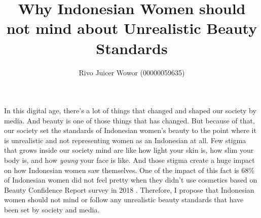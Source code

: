 \documentclass[12pt]{article}
\begin{document}
    \title{Why Indonesian Women should not mind about Unrealistic Beauty Standards}
    \author{Rivo Juicer Wowor (00000059635)}
    \date{}
    \maketitle
    In this digital age, there's a lot of things that changed and shaped our
    society by media. And beauty is one of those things that has changed. But
    because of that, our society set the standards of Indonesian women's beauty
    to the point where it is unrealistic and not representing women as an
    Indonesian at all. Few stigma that grows inside our society mind are like
    how light your skin is, how slim your body is, and how \emph{young} your
    face is like. And those stigma create a huge impact on how Indonesian women
    saw themselves. One of the impact of this fact is 68\% of Indonesian women
    did not feel pretty when they didn't use cosmetics based on Beauty Confidence
    Report survey in 2018 \parencite{maleSurvei84Persen}.
    Therefore, I propose that Indonesian women should not mind or follow any
    unrealistic beauty standards that have been set by society and media.
\end{document}
